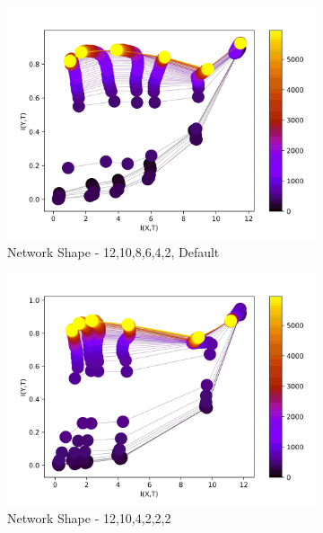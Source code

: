 \documentclass[dissertation.tex]{subfiles}
\begin{document}
\begin{figure}[ht]
  \centering
  \begin{subfigure}[t]{0.32\textwidth}
    \centering
    \includegraphics[width=\textwidth]{figs/eval/networkShape/KDE10,8,6,4.jpg}
    \caption{
      Network Shape - 12,10,8,6,4,2, Default
    }
  \end{subfigure}
  \hfill
  \begin{subfigure}[t]{0.32\textwidth}
    \centering
    \includegraphics[width=\textwidth]{figs/eval/networkShape/KDE10,4,2,2.jpg}
    \caption{
      Network Shape - 12,10,4,2,2,2
    }
  \end{subfigure}
  \hfill
  \begin{subfigure}[t]{0.32\textwidth}

\end{subfigure}
\end{figure}
\end{document}
